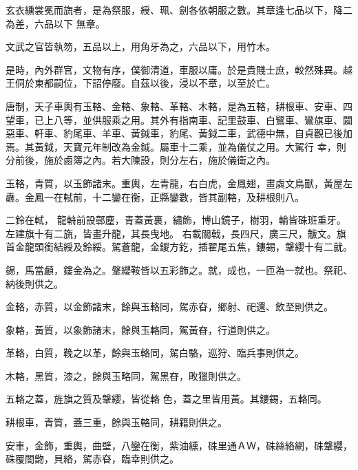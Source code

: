 \begin{pinyinscope}
 玄衣纁裳冕而旒者，是為祭服，綬、珮、劍各依朝服之數。其章逢七品以下，降二為差，六品以下
 無章。



 文武之官皆執笏，五品以上，用角牙為之，六品以下，用竹木。



 是時，內外群官，文物有序，僕御清道，車服以庸。於是貴賤士庶，較然殊異。越王侗於東都嗣位，下詔停廢。自茲以後，浸以不章，以至於亡。



 唐制，天子車輿有玉輅、金輅、象輅、革輅、木輅，是為五輅，耕根車、安車、四望車，已上八等，並供服乘之用。其外有指南車、記里鼓車、白鷺車、鸞旗車、闢惡車、軒車、豹尾車、羊車、黃鉞車，豹尾、黃鉞二車，武德中無，自貞觀已後加焉。其黃鉞，天寶元年制改為金鉞。屬車十二乘，並為儀仗之用。大駕行
 幸，則分前後，施於鹵簿之內。若大陳設，則分左右，施於儀衛之內。



 玉輅，青質，以玉飾諸末。重輿，左青龍，右白虎，金鳳翅，畫虡文鳥獸，黃屋左纛。金鳳一在軾前，十二鑾在衡，正縣鑾數，皆其副輅，及耕根則八。



 二鈴在軾，
 龍輈前設鄣塵，青蓋黃裏，繡飾，博山鏡子，樹羽，輪皆硃班重牙。左建旗十有二旒，皆畫升龍，其長曳地。
 右載闟戟，長四尺，廣三尺，黻文。旗首金龍頭銜結綬及鈴綏。駕蒼龍，金鍐方釳，插翟尾五焦，鏤錫，鞶纓十有二就。



 錫，馬當顱，鏤金為之。鞶纓鞍皆以五彩飾之。就，成也，一匝為一就也。祭祀、納後則供之。



 金輅，赤質，以金飾諸末，餘與玉輅同，駕赤昚，鄉射、祀還、飲至則供之。



 象輅，黃質，以象飾諸末，餘與玉輅同，駕黃昚，行道則供之。



 革輅，白質，鞔之以革，餘與玉輅同，駕白駱，巡狩、臨兵事則供之。



 木輅，黑質，漆之，餘與玉略同，駕黑昚，畋獵則供之。



 五輅之蓋，旌旗之質及鞶纓，皆從輅
 色，蓋之里皆用黃。其鏤錫，五輅同。



 耕根車，青質，蓋三重，餘與玉輅同，耕籍則供之。



 安車，金飾，重輿，曲壁，八鑾在衡，紫油纁，硃里通ＡＷ，硃絲絡網，硃鞶纓，硃覆閤朆，貝絡，駕赤昚，臨幸則供之。




\end{pinyinscope}
